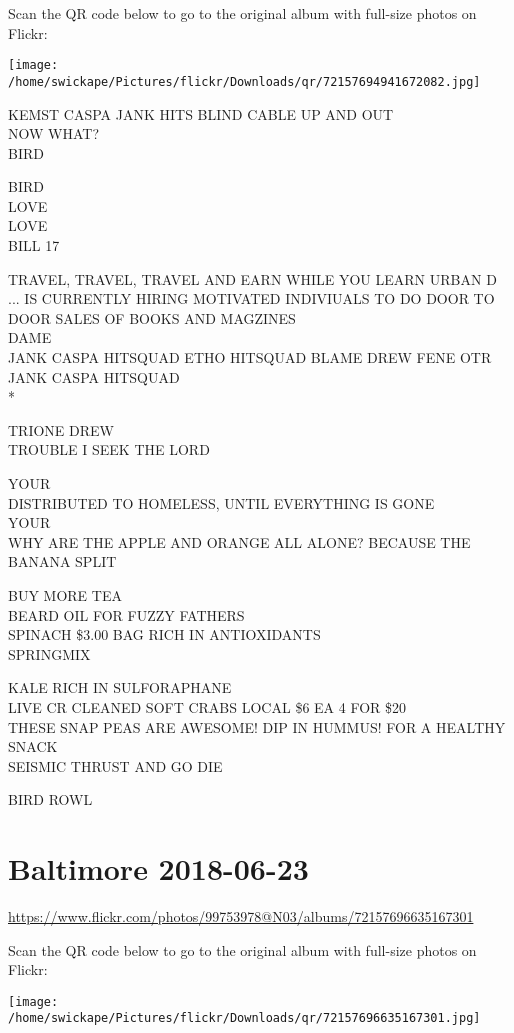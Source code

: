 \documentclass[10pt,letterpaper]{article}
\begin{document}
Scan the QR code below to go to the original album with full-size photos on Flickr:

\texttt{[image: /home/swickape/Pictures/flickr/Downloads/qr/72157694941672082.jpg]}
\pagebreak

KEMST CASPA JANK HITS BLIND CABLE UP AND OUT\\
NOW WHAT?\\
BIRD

BIRD\\
LOVE\\
LOVE\\
BILL 17

TRAVEL, TRAVEL, TRAVEL AND EARN WHILE YOU LEARN URBAN D ... IS CURRENTLY HIRING MOTIVATED INDIVIUALS TO DO DOOR TO DOOR SALES OF BOOKS AND MAGZINES\\
DAME\\
JANK CASPA HITSQUAD ETHO HITSQUAD BLAME DREW FENE OTR JANK CASPA HITSQUAD\\
*

TRIONE DREW\\
TROUBLE I SEEK THE LORD

YOUR\\
DISTRIBUTED TO HOMELESS, UNTIL EVERYTHING IS GONE\\
YOUR\\
WHY ARE THE APPLE AND ORANGE ALL ALONE?  BECAUSE THE BANANA SPLIT

BUY MORE TEA\\
BEARD OIL FOR FUZZY FATHERS\\
SPINACH \$3.00 BAG RICH IN ANTIOXIDANTS\\
SPRINGMIX

KALE RICH IN SULFORAPHANE\\
LIVE CR CLEANED SOFT CRABS LOCAL \$6 EA 4 FOR \$20\\
THESE SNAP PEAS ARE AWESOME!  DIP IN HUMMUS!  FOR A HEALTHY SNACK\\
SEISMIC THRUST AND GO DIE

BIRD ROWL
\pagebreak

\section*{Baltimore 2018-06-23}

\url{https://www.flickr.com/photos/99753978@N03/albums/72157696635167301}

Scan the QR code below to go to the original album with full-size photos on Flickr:

\texttt{[image: /home/swickape/Pictures/flickr/Downloads/qr/72157696635167301.jpg]}
\pagebreak
\end{document}
